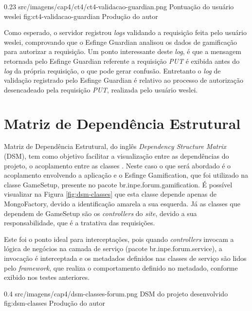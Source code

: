\begin{image}
{0.23}
{src/imagens/cap4/ct4/ct4-validacao-guardian.png}
{Pontuação do usuário weslei}
{fig:ct4-validacao-guardian}
{Produção do autor}
\end{image}

\par Como esperado, o servidor registrou \textit{logs} validando a requisição feita pelo usuário weslei, comprovando que o Esfinge Guardian analisou os dados de gamificação para autorizar a requisição. Um ponto interessante deste \textit{log}, é que a mensagem retornada pelo Esfinge Guardian referente a requisição \textit{PUT} é exibida antes do \textit{log} da própria requisição, o que pode gerar confusão. Entretanto o \textit{log} de validação registrado pelo Esfinge Guardian é relativo ao processo de autorização desencadeado pela requisição \textit{PUT}, realizada pelo usuário weslei.

\section{Matriz de Dependência Estrutural}

\par Matriz de Dependência Estrutural, do inglês \textit{Dependency Structure Matrix} (DSM), tem como objetivo facilitar a visualização entre as dependências do projeto, o acoplamento entre as classes \cite{browning2001applying}. Neste caso o que será abordado é o acoplamento envolvendo a aplicação e o Esfinge Gamification, que foi utilizado na classe GameSetup, presente no pacote br.inpe.forum.gamification. É possível visualizar na Figura \ref{fig:dsm-classes} que esta classe depende apenas de MongoFactory, devido a identificação amarela a sua esquerda. Já as classes que dependem de GameSetup são os \textit{controllers} do \textit{site}, devido a sua responsabilidade, que é a tratativa das requisições.

\par Este foi o ponto ideal para interceptações, pois quando \textit{controllers} invocam a lógica de negócios na camada de serviço (pacote br.inpe.forum.service), a invocação é interceptada e os metadados definidos nas classes de serviço são lidos pelo \textit{framework}, que realiza o comportamento definido no metadado, conforme exibido nos testes anteriores.

\begin{image}
{0.4}
{src/imagens/cap4/dsm-classes-forum.png}
{DSM do projeto desenvolvido}
{fig:dsm-classes}
{Produção do autor}
\end{image}

